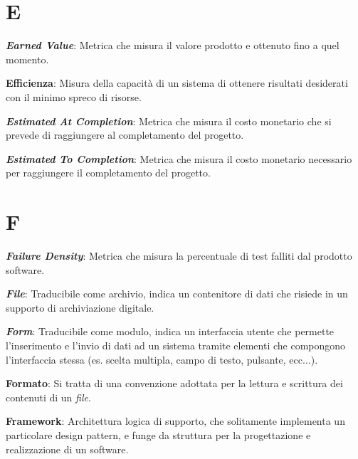 \documentclass[5pt]{article}
\begin{document}
\section*{E}

\textbf{\textit{Earned Value}}: Metrica che misura il valore prodotto e ottenuto fino a quel momento.\newline

\textbf{Efficienza}: Misura della capacità di un sistema di ottenere risultati desiderati con il minimo spreco di risorse.\newline

\textbf{\textit{Estimated At Completion}}: Metrica che misura il costo monetario che si prevede di raggiungere al completamento del progetto.\newline

\textbf{\textit{Estimated To Completion}}: Metrica che misura il costo monetario necessario per raggiungere il completamento del progetto.\newline


\pagebreak

\section*{F}
\begin{flushleft}
	
\textbf{\textit{Failure Density}}: Metrica che misura la percentuale di test falliti dal prodotto software.\newline

\textbf{\textit{File}}: Traducibile come archivio, indica un contenitore di dati che risiede in un supporto di archiviazione digitale.\newline

\textbf{\textit{Form}}: Traducibile come modulo, indica un interfaccia utente che permette l'inserimento e l'invio di dati ad un sistema tramite elementi che compongono l'interfaccia stessa (es. scelta multipla, campo di testo, pulsante, ecc...).\newline

\textbf{Formato}: Si tratta di una convenzione adottata per la lettura e scrittura dei contenuti di un \textit{file}.\newline

\textbf{Framework}: Architettura logica di supporto, che solitamente implementa un particolare design pattern, e funge da struttura per la progettazione e realizzazione di un software.\newline

\end{flushleft}
\end{document}

